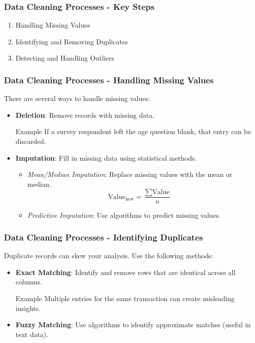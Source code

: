 \documentclass[aspectratio=169]{beamer}
\begin{document}
\begin{frame}[fragile]
  \frametitle{Data Cleaning Processes - Key Steps}
  \begin{enumerate}
    \item Handling Missing Values
    \item Identifying and Removing Duplicates
    \item Detecting and Handling Outliers
  \end{enumerate}
\end{frame}

\begin{frame}[fragile]
  \frametitle{Data Cleaning Processes - Handling Missing Values}
  There are several ways to handle missing values:
  
  \begin{itemize}
    \item \textbf{Deletion}: Remove records with missing data.
    \begin{block}{Example}
      If a survey respondent left the age question blank, that entry can be discarded.
    \end{block}
    
    \item \textbf{Imputation}: Fill in missing data using statistical methods.
    \begin{itemize}
      \item \textit{Mean/Median Imputation}: Replace missing values with the mean or median.
      \begin{equation}
        \text{Value}_{\text{new}} = \frac{\sum \text{Value}}{n}
      \end{equation}
      \item \textit{Predictive Imputation}: Use algorithms to predict missing values.
    \end{itemize}
  \end{itemize}
\end{frame}

\begin{frame}[fragile]
  \frametitle{Data Cleaning Processes - Identifying Duplicates}
  Duplicate records can skew your analysis. Use the following methods:
  
  \begin{itemize}
    \item \textbf{Exact Matching}: Identify and remove rows that are identical across all columns.
    \begin{block}{Example}
      Multiple entries for the same transaction can create misleading insights.
    \end{block}
    \item \textbf{Fuzzy Matching}: Use algorithms to identify approximate matches (useful in text data).
  \end{itemize}
\end{frame}
\end{document}
